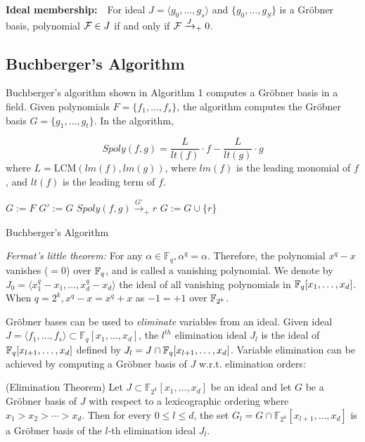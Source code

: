 \begin{Theorem}
{\bf Ideal membership:}\ \ For ideal $J=\langle g_0,\dots,g_s\rangle$ and $\{ g_0,\dots,g_S\}$
is a Gr\"obner basis, polynomial ${\mathcal{F}}\in J$ if and only if ${\mathcal{F}}\xrightarrow{J}_+0$.
\end{Theorem}
\subsection{Buchberger's Algorithm}
\label{sec:buch}
Buchberger's algorithm
shown in Algorithm 1 computes a Gr\"obner
basis in a field. Given polynomials $F = \{f_1, \dots, f_s\}$, 
the algorithm computes the Gr\"obner basis $G = \{g_1, \dots, 
g_t\}$.
In the algorithm,  

\begin{equation}
       Spoly(f,g)=\frac{L}{lt(f)}\cdot f - \frac{L}{lt(g)}\cdot g \nonumber
      \label{eqn:spoly}
\end{equation}
where $L = \text{LCM}(lm(f), lm(g))$, where $lm(f)$ is the leading
monomial of $f$, and $lt(f)$ is the leading term of $f$. 


\begin{algorithm}[hbt]
\label{alg:gb}
\SetAlgoNoLine
  $G:= F$\;
  {
  	$G' := G$\;
	{
		$Spoly(f, g) \stackrel{G'}{\textstyle\longrightarrow}_+r$ \;
		{
			$G:= G \cup \{r\}$ \;
		}
	}
   }
\caption{Buchberger's Algorithm}
\end{algorithm}

{\it Fermat's little theorem:} For any $ \alpha \in \mathbb
F_{q}, \alpha^q = \alpha$. Therefore, the polynomial $x^q - x$
vanishes ($=0$) over ${\mathbb{F}}_{q}$, and is called a vanishing polynomial. We
denote by $J_0 = \langle x_1^q - x_1, \dots, x_d^q - x_d \rangle$ the
ideal of all vanishing polynomials in ${\mathbb{F}}_{q}[x_1, \dots, x_d]$. When $q
= 2^k, x^q - x = x^q + x$ as $-1 = +1$ over ${\mathbb{F}}_{2^k}$.

Gr\"obner bases can be used to {\it eliminate} variables from an
ideal. Given ideal $J = \langle f_1,\dots,f_s\rangle \subset \mathbb
F_{q}[x_1,\dots,x_d]$, the $l^{th}$ elimination ideal $J_l$ is the
ideal of ${\mathbb{F}}_{q}[x_{l+1}, \dots, x_d]$ defined by $J_l = J \cap
{\mathbb{F}}_{q}[x_{l+1}, \dots, x_d]$. Variable elimination can be achieved 
by computing a Gr\"obner basis of $J$ w.r.t. elimination orders: 
\begin{Theorem}
(Elimination Theorem\cite{ideals:book}) Let $J\subset \mathbb
  F_{2^k}[x_1,\dots,x_d]$ be an ideal and let $G$ be a Gr\"obner basis
  of $J$ with respect to a lexicographic ordering where
  $x_1>x_2>\cdots>x_d$. Then for every $0\leq l\leq d$, the set $G_l =
  G\cap\mathbb F_{2^k}[x_{l+1},\dots,x_d]$ is a Gr\"obner basis of
  the $l$-th elimination ideal $J_l$.
\end{Theorem}

